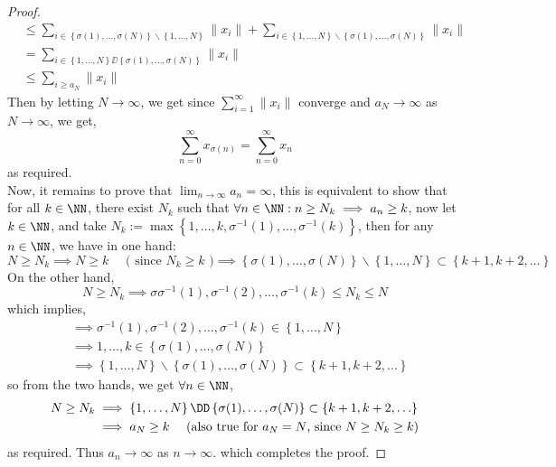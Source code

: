 \begin{proof}
\begin{align*}
									     & \leq 
				\sum_{i \in \left\{ \sigma (1) , \hdots , \sigma (N) \right\} \backslash 
			\left\{ 1, \hdots , N \right\}}^{}
			\| x_{i} \|  + 
			\sum_{i \in  \left\{1, \hdots , N  \right\} \backslash 
		\left\{ \sigma (1) , \hdots , \sigma (N)      \right\}}^{}  
		\| x_{i} \| \\
									     &=
		\sum_{i \in  \left\{ 1, \hdots , N \right\} 
		\DD \left\{ \sigma (1) , \hdots , \sigma (N)      \right\}}^{}  
		\| x_{i} \|  \\
									     & \leq 
		\sum_{i \geq a_{N}}^{}  \| x_{i} \| 
	\end{align*}
	Then by letting $N \rightarrow \infty  $, we get since $\sum_{i=1}^{\infty } \| x_{i} \|  $ 
	converge and 
	$a_{N} \rightarrow \infty  $  as $N \rightarrow \infty  $,  we get, 
	\[
	\sum_{n=0}^{\infty}  x_{\sigma (n)   } = 
	\sum_{n=0}^{\infty}  x_{n}
	\]
	as required. \\
	Now, it remains to prove that $\lim_{n \to \infty} a_{n} =\infty  $, this is equivalent
	to show that for all $k \in \NN $, there exist $N_{k} $ such that $\forall n \in \NN : 
	n \geq N_{k} \implies a_{n} \geq k$, now let $k \in \NN $, and take $N_{k} :=
	\max \left\{ 1, \hdots , k, 
	\sigma ^{-1}(1) , \hdots , \sigma ^{-1}(k)  \right\}$, then for any $n \in \NN $, we have in 
	one hand: 
	\[
	N \geq N_{k} \implies 
	N \geq k \quad \text{ ( since $N_{k} \geq k $  )}   \implies 
	\left\{ \sigma (1) , \hdots , \sigma (N)   \right\} \backslash 
	\left\{ 1, \hdots , N \right\} \subset 
	\left\{ k+1, k+2, \hdots   \right\} 
	\]
	On the other hand, 
	\[
	N \geq N_{k} \implies 
	\sigma \sigma ^{-1}(1), \sigma ^{-1}(2), \hdots , \sigma ^{-1}  (k)  \leq  N_{k} \leq N
	\]
	which implies, 
	\begin{align*}
	& \implies 	\sigma ^{-1}(1) , \sigma ^{-1}(2) , \hdots , \sigma ^{-1}(k)   
		\in \left\{ 1, \hdots , N \right\} \\
	& \implies 
	1, \hdots , k \in  \left\{ \sigma (1) , \hdots , \sigma (N)      \right\} \\
	& \implies 
	\left\{ 1, \hdots , N \right\} \backslash 
	\left\{ \sigma (1) , \hdots , \sigma (N)      \right\} \subset 
	\left\{ k+1, k+2, \hdots  \right\} 
	\end{align*}
	so from the two hands, we get $\forall n \in \NN $, 
	\begin{align*}
		N \geq N_{k} & \implies 
		\left\{ 1, \hdots, N \right\} \DD 
		\left\{ \sigma (1) , \hdots , \sigma (N)      \right\} \subset 
		\left\{ k+1, k+2, \hdots  \right\} \\
			     & \implies 
			     a_{N} \geq k \quad 
			     \text{ (also true for $ a_{N} = N$, since $N \geq N_{k} \geq k $)} 
	\end{align*}
	as required. Thus $a_{n} \rightarrow  \infty  $ as $n \rightarrow \infty  $. which completes
	the proof.
	\end{proof} 
